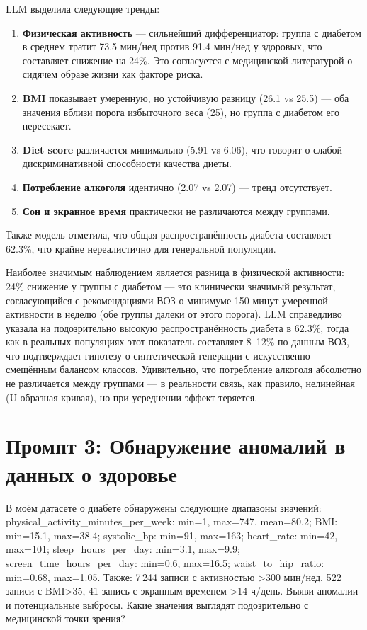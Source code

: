 \documentclass[12pt, a4paper]{article}
\begin{document}
\begin{responsebox}
LLM выделила следующие тренды:

\begin{enumerate}
    \item \textbf{Физическая активность} --- сильнейший дифференциатор: группа с диабетом в среднем тратит 73.5 мин/нед против 91.4 мин/нед у здоровых, что составляет снижение на 24\%. Это согласуется с медицинской литературой о сидячем образе жизни как факторе риска.
    \item \textbf{BMI} показывает умеренную, но устойчивую разницу (26.1 vs 25.5) --- оба значения вблизи порога избыточного веса (25), но группа с диабетом его пересекает.
    \item \textbf{Diet score} различается минимально (5.91 vs 6.06), что говорит о слабой дискриминативной способности качества диеты.
    \item \textbf{Потребление алкоголя} идентично (2.07 vs 2.07) --- тренд отсутствует.
    \item \textbf{Сон и экранное время} практически не различаются между группами.
\end{enumerate}

Также модель отметила, что общая распространённость диабета составляет 62.3\%, что крайне нереалистично для генеральной популяции.
\end{responsebox}

\begin{commentbox}
Наиболее значимым наблюдением является разница в физической активности: 24\% снижение у группы с диабетом --- это клинически значимый результат, согласующийся с рекомендациями ВОЗ о минимуме 150 минут умеренной активности в неделю (обе группы далеки от этого порога). LLM справедливо указала на подозрительно высокую распространённость диабета в 62.3\%, тогда как в реальных популяциях этот показатель составляет 8--12\% по данным ВОЗ, что подтверждает гипотезу о синтетической генерации с искусственно смещённым балансом классов. Удивительно, что потребление алкоголя абсолютно не различается между группами --- в реальности связь, как правило, нелинейная (U-образная кривая), но при усреднении эффект теряется.
\end{commentbox}

\section{Промпт 3: Обнаружение аномалий в данных о здоровье}

\begin{promptbox}
В моём датасете о диабете обнаружены следующие диапазоны значений: physical\_activity\_minutes\_per\_week: min=1, max=747, mean=80.2; BMI: min=15.1, max=38.4; systolic\_bp: min=91, max=163; heart\_rate: min=42, max=101; sleep\_hours\_per\_day: min=3.1, max=9.9; screen\_time\_hours\_per\_day: min=0.6, max=16.5; waist\_to\_hip\_ratio: min=0.68, max=1.05. Также: 7\,244 записи с активностью >300 мин/нед, 522 записи с BMI>35, 41 запись с экранным временем >14 ч/день. Выяви аномалии и потенциальные выбросы. Какие значения выглядят подозрительно с медицинской точки зрения?
\end{promptbox}
\end{document}
